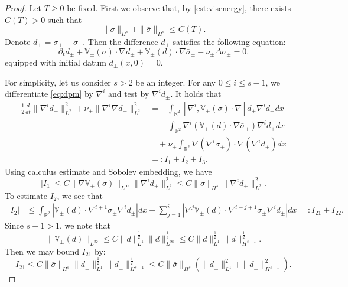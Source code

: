 \documentclass[11pt,reqno]{amsproc}
\newcommand{\na}{\nabla}
\newcommand{\R}{\mathbb{R}}
\newcommand{\V}{\mathbb{V}}
\newcommand{\p}{\partial}
\newcommand{\pt}{\p_t}
\begin{document}
\begin{proof}
    Let $T \ge 0$ be fixed. First we observe that, by \eqref{est:visenergy}, there exists $C(T) > 0$ such that
    \begin{equation}
        \label{est:uniform}
        \|\sigma\|_{H^s} + \|\bar\sigma\|_{H^s} \le C(T).
    \end{equation}
    Denote $d_\pm = \sigma_\pm - \bar\sigma_\pm$. Then the difference $d_\pm$ satisfies the following equation:
    \begin{equation}
        \label{eq:dpm}
        \pt d_\pm + \mathbb V_{\pm}(\sigma)\cdot\na d_{\pm} + \mathbb V_{\pm}(d)\cdot\na \bar\sigma_{\pm} - \nu_\pm \Delta \sigma_\pm = 0.
    \end{equation}
    equipped with initial datum $d_\pm(x,0) = 0$.
    
    For simplicity, let us consider $s > 2$ be an integer. For any $0 \le i \le s-1$, we differentiate \eqref{eq:dpm} by $\na^i$ and test by $\na^i d_\pm$. It holds that
    \begin{align*}
        \frac12 \frac{d}{dt} \|\na^i d_\pm\|_{L^2}^2 + \nu_\pm \|\na^i\na d_\pm\|_{L^2}^2 &= -\int_{\R^2} [\na^i, \mathbb V_\pm(\sigma)\cdot \nabla] d_\pm \nabla^i d_\pm dx\\
        &\quad -\int_{\R^2} \na^i(\mathbb{V}_\pm(d) \cdot \na \bar\sigma_\pm) \na^i d_\pm dx\\
        &\quad + \nu_\pm \int_{\R^2} \na(\na^i \bar\sigma_\pm) \cdot \na(\na^i d_{\pm}) dx\\
        &=: I_1 + I_2 + I_3.
    \end{align*}
    Using calculus estimate and Sobolev embedding, we have
    $$
    |I_1| \le C \|\na \mathbb V_\pm(\sigma)\|_{L^\infty} \|\na^id_\pm\|_{L^2}^2 \le C\|\sigma\|_{H^s}\|\na^id_\pm\|_{L^2}^2.
    $$
    To estimate $I_2$, we see that
    \begin{align*}
        |I_2| &\le \int_{\R^2} |\V_\pm(d) \cdot \nabla^{i+1}\bar\sigma_\pm \na^i d_\pm| dx + \sum_{j=1}^i |\na^j \V_\pm (d) \cdot \na^{i-j+1}\bar\sigma_\pm \na^i d_\pm | dx =: I_{21} + I_{22}.
    \end{align*}
    Since $s - 1 > 1$, we note that 
    \begin{equation}\label{Vestvisc}
    \|\V_\pm(d)\|_{L^\infty} \le C\|d\|_{L^1}^{\frac12}\|d\|_{L^\infty}^\frac12 \le C\|d\|_{L^1}^{\frac12}\|d\|_{H^{s-1}}^\frac12.
    \end{equation}
    Then we may bound $I_{21}$ by:
    $$
    I_{21} \le C\|\bar\sigma\|_{H^s}\|d_\pm\|_{L^1}^{\frac12}\|d_\pm\|_{H^{s-1}}^\frac32 \le C\|\bar\sigma\|_{H^s}\left(\|d_\pm\|_{L^1}^2 + \|d_\pm\|_{H^{s-1}}^2\right).
$$
\end{proof}
\end{document}
